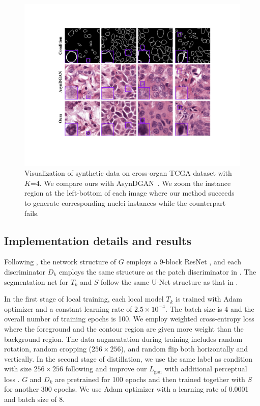 \documentclass[letterpaper]{article} %
\begin{document}
\begin{figure}[h]
\centering
\includegraphics[width=\linewidth]{fig/sfig2.pdf}
\caption{Visualization of synthetic data on cross-organ TCGA dataset with $K$=4. We compare ours with AsynDGAN~\cite{chang2020synthetic}.  We zoom the instance region at the left-bottom of each image where our method succeeds to generate corresponding nuclei instances while the counterpart fails.
} 
\label{fig:s2}
\end{figure}

\subsection{Implementation details and results}
Following \cite{chang2020synthetic}, the network structure of $G$ employs a 9-block ResNet \cite{he2016deep}, and each discriminator $D_k$ employs the same structure as the patch discriminator in \cite{isola2017image}. The segmentation net for $T_k$ and $S$ follow the same U-Net \cite{ronneberger2015u} structure as that in \cite{chang2020synthetic}. 

In the first stage of local training, each local model $T_k$ is trained with Adam optimizer and a constant learning rate of $2.5\times10^{-4}$. The batch size is 4 and the overall number of training epochs is 100. We employ weighted cross-entropy loss where the foreground and the contour region are given more weight than the background region.
The data augmentation during training includes random rotation, random cropping ($256 \times 256$), and random flip both horizontally and vertically. 
In the second stage of distillation, we use the same label as condition with size $256 \times 256$ following \cite{chang2020synthetic} and improve our $L_\text{gan}$ with additional perceptual loss \cite{johnson2016perceptual}. $G$ and $D_k$ are pretrained for 100 epochs and then trained together with $S$ for another 300 epochs. We use Adam optimizer with a learning rate of 0.0001 and batch size of 8.   
\end{document}
